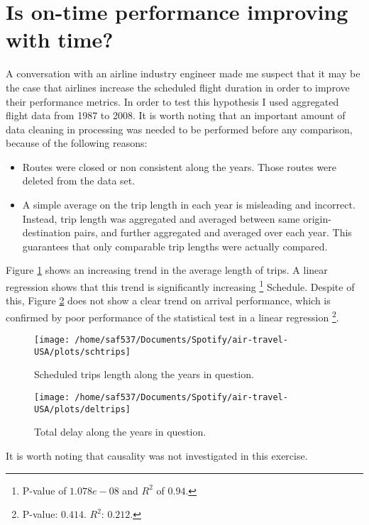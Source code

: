 \documentclass[a4paper, 11pt]{article}
\begin{document}
\section*{Is on-time performance improving with time?}

A conversation with an airline industry engineer made me suspect that it may be the case that airlines increase the scheduled flight duration in order to improve their performance metrics. In order to test this hypothesis I used aggregated flight data from 1987 to 2008. It is worth noting that an important amount of data cleaning in processing was needed to be performed before any comparison, because of the following reasons:

\begin{itemize}
\item Routes were closed or non consistent along the years. Those routes were deleted from the data set.
\item A simple average on the trip length in each year is misleading and incorrect. Instead, trip length was aggregated and averaged between same origin-destination pairs, and further aggregated and averaged over each year. This guarantees that only comparable trip lengths were actually compared.
\end{itemize}


Figure \ref{schedule} shows an increasing trend in the average length of trips. A linear regression shows that this trend is significantly increasing \footnote{P-value of $1.078e-08$ and $R^2$ of $0.94$.}
Schedule. Despite of this, Figure \ref{delays} does not show a clear trend on arrival performance, which is confirmed by poor performance of the statistical test in a linear regression \footnote{P-value: $0.414$. $R^2$: $0.212$.}. 



\begin{figure}[!ht]
  \caption{Scheduled trips length along the years in question.}
  \label{schedule}
  \centering
    \texttt{[image: /home/saf537/Documents/Spotify/air-travel-USA/plots/schtrips]}
\end{figure}

\begin{figure}[!ht]
  \caption{Total delay along the years in question.}
  \label{delays}
  \centering
    \texttt{[image: /home/saf537/Documents/Spotify/air-travel-USA/plots/deltrips]}
\end{figure}

It is worth noting that causality was not investigated in this exercise.
\end{document}
